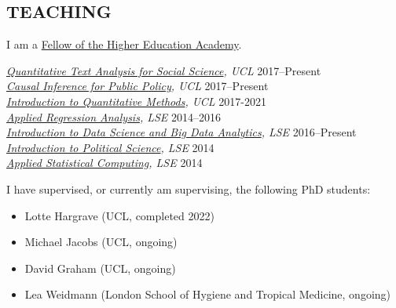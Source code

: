 \documentclass[centered]{res}
\begin{document}
\begin{resume}
\section{TEACHING} 	

\vspace{.5cm}

I am a \href{https://www.advance-he.ac.uk/fellowship/fellowship}{Fellow of the Higher Education Academy}.

{\sl\href{https://uclspp.github.io/PUBLG088/}{Quantitative Text Analysis for Social Science}, UCL} \hfill 2017--Present \\
{\sl\href{https://uclspp.github.io/PUBLG088/}{Causal Inference for Public Policy}, UCL} \hfill 2017--Present \\
{\sl\href{http://uclspp.github.io/PUBLG100/}{Introduction to Quantitative Methods}, UCL} \hfill 2017-2021 \\
{\sl\href{http://www.lse.ac.uk/resources/calendar/courseGuides/MY/2014_MY452.htm}{Applied Regression Analysis}, LSE} \hfill 2014--2016 \\
{\sl\href{http://www.lse.ac.uk/study/summerSchools/Methods/Mathematics-&-Statistics/ME114.aspx}{Introduction to Data Science and Big Data Analytics}, LSE} \hfill 2016--Present \\
{\sl\href{http://www.lse.ac.uk/resources/calendar/courseGuides/GV/2015_GV101.htm}{Introduction to Political Science}, LSE} \hfill 2014 \\	
{\sl\href{http://www.lse.ac.uk/resources/calendar/courseGuides/MY/2014_MY459.htm}{Applied Statistical Computing}, LSE} \hfill 2014 	

I have supervised, or currently am supervising, the following PhD students:

\begin{itemize}
\item Lotte Hargrave (UCL, completed 2022)
\item Michael Jacobs (UCL, ongoing)
\item David Graham (UCL, ongoing)
\item Lea Weidmann (London School of Hygiene and Tropical Medicine, ongoing)
\end{itemize}

%
%
                 

\end{resume}
\end{document}

